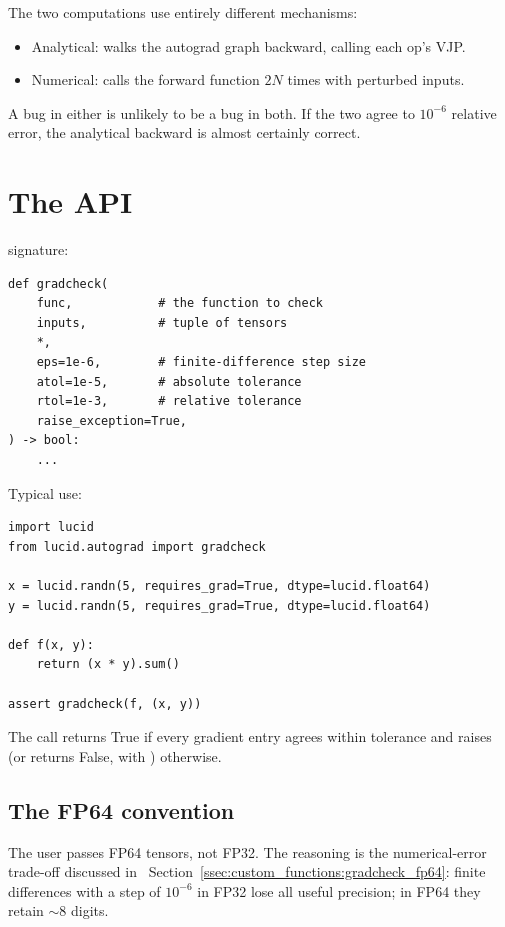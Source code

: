 The two computations use entirely different mechanisms:

\begin{itemize}
  \item Analytical: walks the autograd graph backward, calling
    each op's VJP.
  \item Numerical: calls the forward function $2N$ times with
    perturbed inputs.
\end{itemize}

A bug in either is unlikely to be a bug in both. If the two agree
to $10^{-6}$ relative error, the analytical backward is almost
certainly correct.

\section{The API}
\label{sec:gradcheck:api}

 signature:

\begin{lstlisting}[style=lucid,language=LucidPython]
def gradcheck(
    func,            # the function to check
    inputs,          # tuple of tensors
    *,
    eps=1e-6,        # finite-difference step size
    atol=1e-5,       # absolute tolerance
    rtol=1e-3,       # relative tolerance
    raise_exception=True,
) -> bool:
    ...
\end{lstlisting}

Typical use:

\begin{lstlisting}[style=lucid,language=LucidPython]
import lucid
from lucid.autograd import gradcheck

x = lucid.randn(5, requires_grad=True, dtype=lucid.float64)
y = lucid.randn(5, requires_grad=True, dtype=lucid.float64)

def f(x, y):
    return (x * y).sum()

assert gradcheck(f, (x, y))
\end{lstlisting}

The call returns True if every gradient entry agrees within
tolerance and raises (or returns False, with
) otherwise.

\subsection{The FP64 convention}
\label{ssec:gradcheck:fp64_conv}

The user passes FP64 tensors, not FP32. The reasoning is the
numerical-error trade-off discussed in
~Section~\ref{ssec:custom_functions:gradcheck_fp64}:
finite differences with a step of $10^{-6}$ in FP32 lose all
useful precision; in FP64 they retain $\sim 8$ digits.

